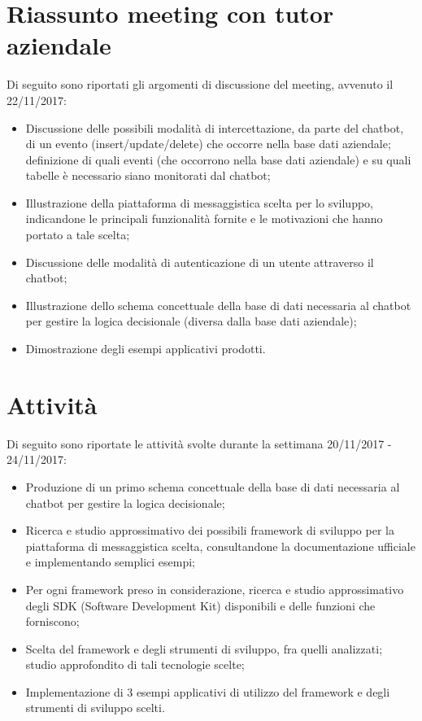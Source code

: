 \documentclass[11pt,notitlepage]{article}
\begin{document}
\section*{Riassunto meeting con tutor aziendale}
Di seguito sono riportati gli argomenti di discussione del meeting, avvenuto il 22/11/2017:
\begin{itemize}
		\item Discussione delle possibili modalità di intercettazione, da parte del chatbot, di un evento (insert/update/delete) che occorre nella base dati aziendale; definizione di quali eventi (che occorrono nella base dati aziendale) e su quali tabelle è necessario siano monitorati dal chatbot;
		\item Illustrazione della piattaforma di messaggistica scelta per lo sviluppo, indicandone le principali funzionalità fornite e le motivazioni che hanno portato a tale scelta;
		\item Discussione delle modalità di autenticazione di un utente attraverso il chatbot;
		\item Illustrazione dello schema concettuale della base di dati necessaria al chatbot per gestire la logica decisionale (diversa dalla base dati aziendale);
		\item Dimostrazione degli esempi applicativi prodotti.
\end{itemize} 




\bigskip
\section*{Attività}
Di seguito sono riportate le attività svolte durante la settimana 20/11/2017 - 24/11/2017:
\begin{itemize}
		\item Produzione di un primo schema concettuale della base di dati necessaria al chatbot per gestire la logica decisionale;
		\item Ricerca e studio approssimativo dei possibili framework di sviluppo per la piattaforma di messaggistica scelta, consultandone la documentazione ufficiale e implementando semplici esempi;
		\item Per ogni framework preso in considerazione, ricerca e studio approssimativo degli SDK (Software Development Kit) disponibili e delle funzioni che forniscono;
		\item Scelta del framework e degli strumenti di sviluppo, fra quelli analizzati; studio approfondito di tali tecnologie scelte;
		\item Implementazione di 3 esempi applicativi di utilizzo del framework e degli strumenti di sviluppo scelti.
\end{itemize}
\end{document}
